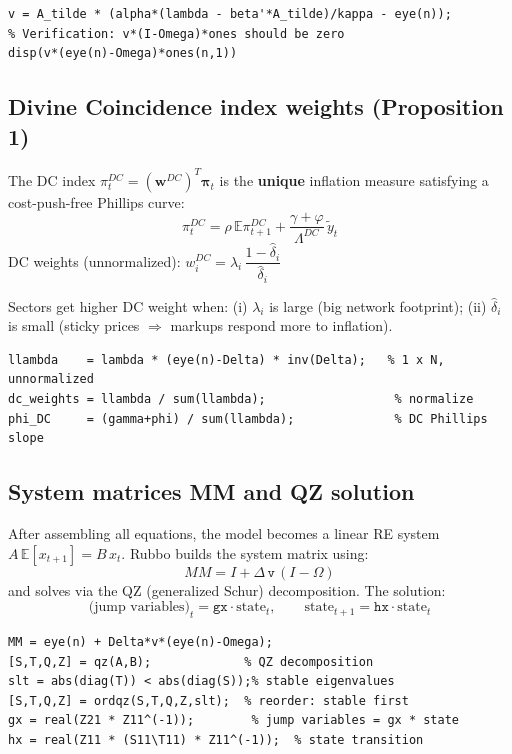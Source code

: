 \documentclass[11pt]{article}
\begin{document}
\begin{lstlisting}[caption={Matlab: cost-push matrix (matches parameters\_d.m)}]
v = A_tilde * (alpha*(lambda - beta'*A_tilde)/kappa - eye(n));
% Verification: v*(I-Omega)*ones should be zero
disp(v*(eye(n)-Omega)*ones(n,1))
\end{lstlisting}

\subsection{Divine Coincidence index weights (Proposition 1)}

The DC index $\pi^{DC}_t = (\mathbf{w}^{DC})^T\boldsymbol\pi_t$ is the \textbf{unique}
inflation measure satisfying a cost-push-free Phillips curve:
\[
  \pi^{DC}_t = \rho\,\mathbb{E}\pi^{DC}_{t+1} + \frac{\gamma+\varphi}{\Lambda^{DC}}\,\tilde{y}_t
\]
DC weights (unnormalized): $w^{DC}_i = \lambda_i\,\dfrac{1-\hat\delta_i}{\hat\delta_i}$

Sectors get higher DC weight when: (i) $\lambda_i$ is large (big network footprint);
(ii) $\hat\delta_i$ is small (sticky prices $\Rightarrow$ markups respond more to inflation).

\begin{lstlisting}[caption={Matlab: DC index weights (matches parameters\_d.m)}]
llambda    = lambda * (eye(n)-Delta) * inv(Delta);   % 1 x N, unnormalized
dc_weights = llambda / sum(llambda);                  % normalize
phi_DC     = (gamma+phi) / sum(llambda);              % DC Phillips slope
\end{lstlisting}

\subsection{System matrices MM and QZ solution}

After assembling all equations, the model becomes a linear RE system
$A\,\mathbb{E}[x_{t+1}] = B\,x_t$. Rubbo builds the system matrix using:
\[
  MM = I + \Delta\,\mathtt{v}\,(I-\Omega)
\]
and solves via the QZ (generalized Schur) decomposition. The solution:
\[
  \text{(jump variables)}_t = \mathtt{gx} \cdot \text{state}_t, \qquad
  \text{state}_{t+1} = \mathtt{hx} \cdot \text{state}_t
\]

\begin{lstlisting}[caption={Matlab: system matrix and QZ solve}]
MM = eye(n) + Delta*v*(eye(n)-Omega);
[S,T,Q,Z] = qz(A,B);             % QZ decomposition
slt = abs(diag(T)) < abs(diag(S));% stable eigenvalues
[S,T,Q,Z] = ordqz(S,T,Q,Z,slt);  % reorder: stable first
gx = real(Z21 * Z11^(-1));        % jump variables = gx * state
hx = real(Z11 * (S11\T11) * Z11^(-1));  % state transition
\end{lstlisting}
\end{document}
